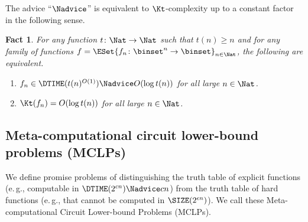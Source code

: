 \documentclass[11pt]{article}
\numberwithin{equation}{section}
\newtheorem{fact}[theorem]{Fact}
\theoremstyle{definition}
\theoremstyle{plain}
\newcommand{\eg}{e.\,g.}
\begin{document}
The advice ``$\Nadvice$'' is equivalent to $\Kt$-complexity
up to a constant factor
in the following sense.
\begin{fact}
  \label{fact_KtandAdvice}
  For any function $t \colon \Nat \to \Nat$
  such that $t(n) \ge n$
  and for any family of functions $f = \ESet{ f_n \colon \binset^n \to \binset }_{n \in \Nat}$,
  the following are equivalent.
  \begin{enumerate}
    \item
          $f_n \in \DTIME(t(n)^{O(1)}) \Nadvice O(\log t(n))$ for all large $n \in \Nat$.
    \item
          $\Kt(f_n) = O(\log t(n))$ for all large $n \in \Nat$.
  \end{enumerate}
\end{fact}

\subsection{Meta-computational circuit lower-bound problems (MCLPs)}
\label{subsection_DefiningMCLPs}
We define promise problems of
distinguishing
the truth table of explicit functions (\eg, computable in $\DTIME(2^{c n}) \Nadvice c n$)
from
the truth table of hard functions (\eg, that cannot be computed in $\SIZE(2^{\epsilon n})$).
We call these
Meta-computational Circuit Lower-bound Problems (MCLPs).
\end{document}
